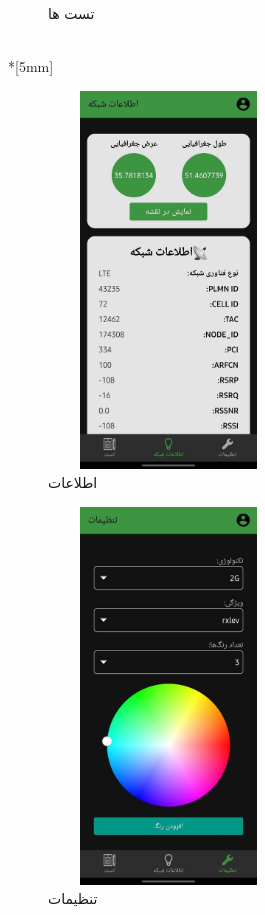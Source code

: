 \documentclass{report}
\begin{document}
\begin{figure}[ht]
\begin{subfigure}[b]{0.3\textwidth}
		\caption{تست ها}
		\label{fig:test}
	\end{subfigure}\\*[5mm]
	\begin{subfigure}[b]{0.3\textwidth}\centering
	\includegraphics[width=0.7\textwidth,height=10cm,keepaspectratio]{Pic/info}
		\caption{اطلاعات}
		\label{fig:info}
	\end{subfigure}
	\begin{subfigure}[b]{0.3\textwidth}\centering
	\includegraphics[width=0.7\textwidth,height=10cm,keepaspectratio]{Pic/setting}
		\caption{تنظیمات}
		\label{fig:setting}
	\end{subfigure}
	\begin{subfigure}[b]{0.3\textwidth}\centering

\end{subfigure}
\end{figure}
\end{document}

